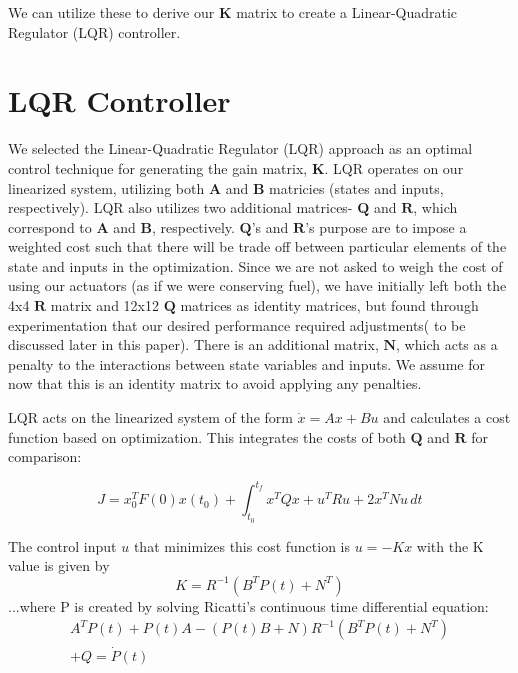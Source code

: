 \documentclass{article}
\begin{document}
\begin{multicols}{2}
We can utilize these to derive our $\boldsymbol{K}$ matrix to create a Linear-Quadratic Regulator (LQR) controller.

\section*{LQR Controller}
We selected the Linear-Quadratic Regulator (LQR) approach as an optimal control technique for generating the gain matrix, $
\boldsymbol{K}$.  LQR operates on our linearized system, utilizing both $\boldsymbol{A}$ and $\boldsymbol{B}$ matricies (states 
and inputs, respectively). LQR also utilizes two additional matrices- $\boldsymbol{Q}$ and $\boldsymbol{R}$, which correspond to $\boldsymbol{A}$ and $\boldsymbol{B}$, respectively. $\boldsymbol{Q}$'s and $\boldsymbol{R}$'s purpose are to impose a weighted cost such that there will be trade off between particular elements of the state and inputs in the optimization. Since we are not asked to weigh the cost of using our actuators (as if we were conserving fuel), we have initially left both the  4x4 $\boldsymbol{R}$ matrix and 12x12 $\boldsymbol{Q}$ matrices as identity matrices, but found through experimentation that our desired performance required adjustments( to be discussed later in this paper). There is an additional matrix, $\boldsymbol{N}$, 
which acts as a penalty to the interactions between state variables and inputs. We assume for now that this is an identity matrix to avoid applying any penalties.

LQR acts on the linearized system of the form $\dot{x} = Ax + Bu$ and calculates a cost function based on optimization.  This 
integrates the costs of both $\boldsymbol{Q}$ and $\boldsymbol{R}$ for comparison:

\begin{equation}
    J =x_0^TF(0)x(t_0) +  \int_{t_0}^{t_f} x^TQx+u^TRu +2x^TNu\,dt 
\end{equation}

The control input $u$ that minimizes this cost function is $u= -Kx$ with the K value is given by
\begin{equation}
    K = R^{-1}(B^TP(t) + N^T)
\end{equation}
\noindent
...where P is created by solving Ricatti's continuous time differential equation:
\begin{align}
A^TP(t) + P(t)A - (P(t)B + N)R^{-1}(B^TP(t) + N^T) \nonumber\\+ Q = \dot{P}(t)
\end{align}


\end{multicols}
\end{document}
